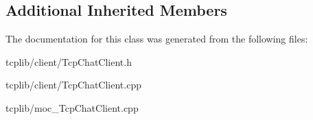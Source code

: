 \subsection*{Additional Inherited Members}


The documentation for this class was generated from the following files\-:\begin{DoxyCompactItemize}
\item 
tcplib/client/Tcp\-Chat\-Client.\-h\item 
tcplib/client/Tcp\-Chat\-Client.\-cpp\item 
tcplib/moc\-\_\-\-Tcp\-Chat\-Client.\-cpp\end{DoxyCompactItemize}
